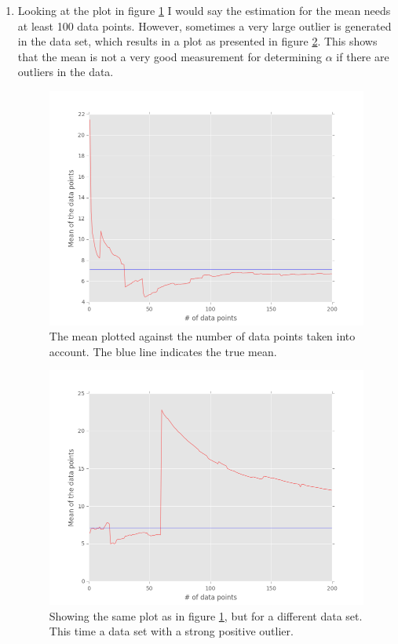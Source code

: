 \documentclass[paper=a4, fontsize=10pt]{scrartcl} %
\numberwithin{equation}{section} %
\numberwithin{figure}{section} %
\numberwithin{table}{section} %
\begin{document}
\begin{enumerate}
	\item Looking at the plot in figure \ref{meanplot} I would say the estimation for the mean needs at least 100 data points. However, sometimes a very large outlier is generated in the data set, which results in a plot as presented in figure \ref{badplot}. This shows that the mean is not a very good measurement for determining $\alpha$ if there are outliers in the data.
			\begin{figure}[H]
				\centering
				\includegraphics[scale=0.7]{mean_plot.png}
				\caption{The mean plotted against the number of data points taken into account. The blue line indicates the true mean.}
				\label{meanplot}
			\end{figure}

			\begin{figure}[H]
				\centering
				\includegraphics[scale=0.7]{messed_up.png}
				\caption{Showing the same plot as in figure \ref{meanplot}, but for a different data set. This time a data set with a strong positive outlier.} 
				\label{badplot}
			\end{figure}
			\end{enumerate}
\end{document}
